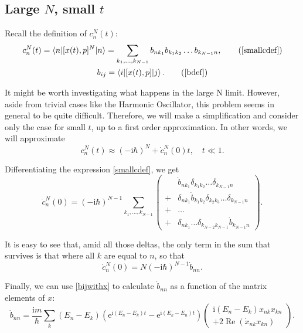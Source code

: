 \documentclass{article}
\newcommand{\e}{\mathrm{e}}
\newcommand{\I}{\mathrm{i}}
\DeclareMathOperator{\re}{Re}
\begin{document}
\subsection{Large $N$, small $t$}

Recall the definition of $c_n^N(t)$:
\begin{gather}
c_n^N(t) = \braket{n|[x(t), p]^N|n} = \sum_{k_1, \dots, k_{N-1}} b_{nk_1} b_{k_1 k_2} \dots b_{k_{N-1} n}, \tag{\ref{smallcdef}}\\
b_{ij} = \braket{i|[x(t), p]|j}. \tag{\ref{bdef}}
\end{gather}

It might be worth investigating what happens in the large N limit. However, aside from trivial cases like the Harmonic Oscillator, this problem seems in general to be quite difficult. Therefore, we will make a simplification and consider only the case for small $t$, up to a first order approximation. In other words, we will approximate
\[c_n^N(t) \approx (-\I \hbar)^N + \dot c_n^N(0) t,\quad t \ll 1.\]

Differentiating the expression \eqref{smallcdef}, we get
\begin{equation}
\dot c_n^N(0) = (-\I \hbar)^{N-1} \sum_{k_1, \dots, k_{N-1}}
\left(
\begin{aligned}
&\dot b_{n k_1} \delta_{k_1 k_2} \dots \delta_{k_{N-1} n}\\
+ &\delta_{n k_1} \dot b_{k_1 k_2} \delta_{k_2 k_3} \dots \delta_{k_{N-1} n}\\
+ &\dots\\
+ &\delta_{n k_1} \dots \delta_{k_{N-2} k_{N-1}} \dot b_{k_{N-1} n}
\end{aligned}
\right).
\end{equation}

It is easy to see that, amid all those deltas, the only term in the sum that survives is that where all $k$ are equal to $n$, so that
\begin{equation}
\dot c_n^N(0) = N (-\I \hbar)^{N-1} \dot b_{nn}.
\end{equation}

Finally, we can use \eqref{bijwithx} to calculate $\dot b_{nn}$ as a function of the matrix elements of $x$:
\begin{equation}
\dot b_{nn} = \frac{\I m}\hbar \sum_k (E_n - E_k) \left( \e^{\I (E_n - E_k) t} - \e^{\I (E_k - E_n) t} \right) \left(\begin{multlined}
\I (E_n - E_k) x_{nk} x_{kn}\\
+ 2 \re(\dot x_{nk} x_{kn})
\end{multlined}\right).
\end{equation}
\end{document}
